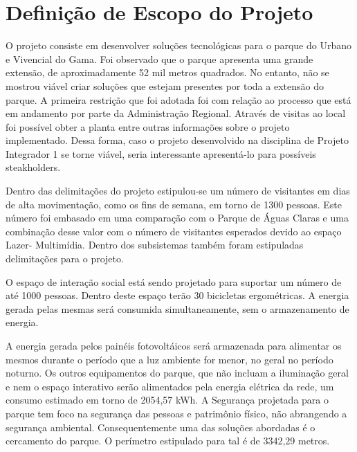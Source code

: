 \section{Definição de Escopo do Projeto}

	O projeto consiste em desenvolver soluções tecnológicas para o parque do Urbano e Vivencial do Gama. Foi observado que o parque apresenta uma grande extensão, de aproximadamente 52 mil metros quadrados. No entanto, não se mostrou viável criar soluções que estejam presentes por toda a extensão do parque. A primeira restrição que foi adotada foi com relação ao processo que está em andamento por parte da Administração Regional. Através de visitas ao local foi possível obter a planta entre outras informações sobre o projeto implementado. Dessa forma, caso o projeto desenvolvido na disciplina de Projeto Integrador 1 se torne viável, seria interessante apresentá-lo para possíveis steakholders. 

	Dentro das delimitações do projeto estipulou-se um número de visitantes em dias de alta movimentação, como os fins de semana, em torno de 1300 pessoas. Este número foi embasado em uma comparação com o Parque de Águas Claras e uma combinação desse valor com o número de visitantes esperados devido ao espaço Lazer- Multimídia. 
Dentro dos subsistemas também foram estipuladas delimitações para o projeto. 
	
	O espaço de interação social está sendo projetado para suportar um número de até 1000 pessoas. Dentro deste espaço terão 30 bicicletas ergométricas. A energia gerada pelas mesmas será consumida simultaneamente, sem o armazenamento de energia. 
	
	A energia gerada pelos painéis fotovoltáicos será armazenada para alimentar os mesmos durante o período que a luz ambiente for menor, no geral no período noturno. Os outros equipamentos do parque, que não incluam a iluminação geral e nem o espaço interativo serão alimentados pela energia elétrica da rede, um consumo estimado em torno de  2054,57 kWh. A Segurança projetada para o parque tem foco na segurança das pessoas e patrimônio físico, não abrangendo a segurança ambiental. Consequentemente uma das soluções abordadas é o cercamento do parque. O perímetro estipulado para tal é de 3342,29 metros. 